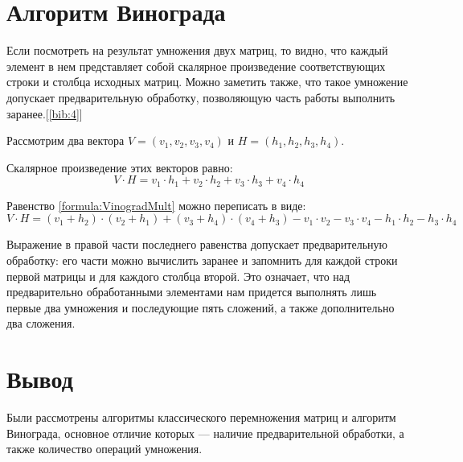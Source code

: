 	\section{Алгоритм Винограда}
	\par Если посмотреть на результат умножения двух матриц, то видно, что каждый элемент в нем представляет собой скалярное произведение соответствующих строки и столбца исходных матриц. Можно заметить также, что такое умножение допускает предварительную обработку, позволяющую часть работы выполнить заранее.[\ref{bib:4}]
	\par Рассмотрим два вектора \begin{math}V = (v_1, v_2, v_3, v_4)\end{math} и \begin{math}H = (h_1, h_2, h_3, h_4)\end{math}.
	\par Скалярное произведение этих векторов равно:
	\begin{equation}\label{formula:VinogradMult}
	V \cdot H = v_1 \cdot h_1 + v_2 \cdot h_2 + v_3 \cdot h_3 + v_4 \cdot h_4
	\end{equation}
	\par Равенство \ref{formula:VinogradMult} можно переписать в виде:
	\begin{equation}\label{formula:VinogradMult_1}
	V \cdot H = (v_1  + h_2) \cdot (v_2  + h_1) + (v_3  + h_4) \cdot (v_4  + h_3) - v_1 \cdot v_2 - v_3 \cdot v_4 - h_1 \cdot h_2 - h_3 \cdot h_4
	\end{equation}
	\par Выражение в правой части последнего равенства допускает предварительную обработку: его части можно вычислить заранее и запомнить для каждой строки первой матрицы и для каждого столбца второй. Это означает, что над предварительно обработанными элементами нам придется выполнять лишь первые два умножения и последующие пять сложений, а также дополнительно два сложения.
	\section*{Вывод}
\par Были рассмотрены алгоритмы классического перемножения матриц и алгоритм Винограда, основное отличие которых — наличие предварительной обработки, а также количество операций умножения.
\newpage
